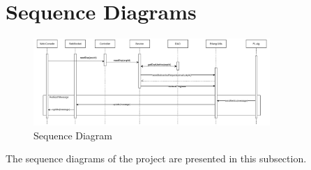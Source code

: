 \section{Sequence Diagrams}

\begin{figure}[ht!]
    \centering
    \includegraphics[width=0.8\textwidth]{images/2_analisys/FL_sequence_diagram.png}
    \caption{Sequence Diagram}
    \label{fig:sequence_diagram}
\end{figure}

The sequence diagrams of the project are presented in this subsection.

